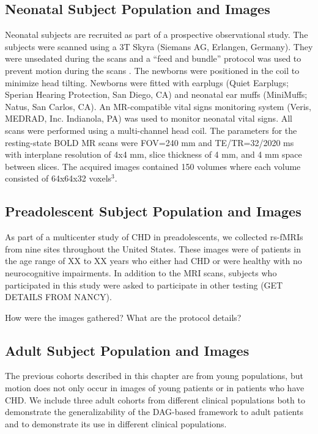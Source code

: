 \subsection{Neonatal Subject Population and Images}

Neonatal subjects are recruited as part of a prospective observational study. The subjects were scanned using a 3T Skyra (Siemans AG, Erlangen, Germany). They were unsedated during the scans and a ``feed and bundle'' protocol was used to prevent motion during the scans \cite{Windram2011}. The newborns were positioned in the coil to minimize head tilting. Newborns were fitted with earplugs (Quiet Earplugs; Sperian Hearing Protection, San Diego, CA) and neonatal ear muffs (MiniMuffs; Natus, San Carlos, CA). An MR-compatible vital signs monitoring system (Veris, MEDRAD, Inc. Indianola, PA) was used to monitor neonatal vital signs. All scans were performed using a multi-channel head coil. The parameters for the resting-state BOLD MR scans were FOV=240 mm and TE/TR=32/2020 ms with interplane resolution of 4x4 mm, slice thickness of 4 mm, and 4 mm space between slices. The acquired images contained 150 volumes where each volume consisted of 64x64x32 voxels$^3$.

\subsection{Preadolescent Subject Population and Images}

As part of a multicenter study of CHD in preadolescents, we collected rs-fMRIs from nine sites throughout the United States. These images were of patients in the age range of XX to XX years who either had CHD or were healthy with no neurocognitive impairments. In addition to the MRI scans, subjects who participated in this study were asked to participate in other testing (GET DETAILS FROM NANCY).

How were the images gathered? What are the protocol details?

\subsection{Adult Subject Population and Images}

The previous cohorts described in this chapter are from young populations, but motion does not only occur in images of young patients or in patients who have CHD. We include three adult cohorts from different clinical populations both to demonstrate the generalizability of the DAG-based framework to adult patients and to demonstrate its use in different clinical populations.

